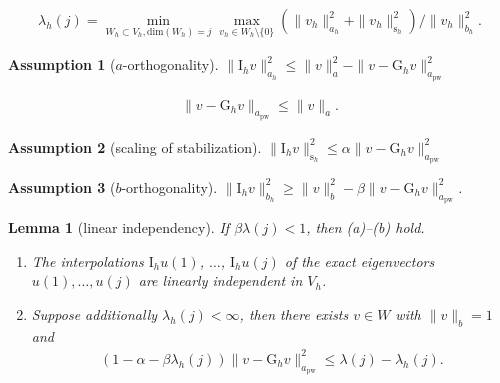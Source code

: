\documentclass[10pt,a4paper]{amsart}
\newtheorem{assumption}{Assumption}
\newtheorem{lemma}{Lemma}
\newcommand{\I}{\mathrm{I}}
\newcommand{\pw}{\mathrm{pw}}
\newcommand{\s}{\mathrm{s}}
\begin{document}
\begin{align}\label{eq:min-max-principle-discrete}
	\lambda_h(j) = \min_{W_h \subset V_h, \mathrm{dim}(W_h) = j} \max_{v_h \in W_h \setminus\{0\}} (\|v_h\|_{a_h}^2 + \|v_h\|_{\s_h}^2)/\|v_h\|_{b_h}^2.
\end{align}

\begin{assumption}[$a$-orthogonality]\label{A}
	$\|\I_h v\|_{a_h}^2 \leq \|v\|^2_a - \|v - \mathrm{G}_h v\|_{a_\pw}^2$
\end{assumption}

\begin{align}\label{ineq:v-Gv<=v}
	\|v - \mathrm{G}_h v\|_{a_\pw} \leq \|v\|_a.
\end{align}

\begin{assumption}[scaling of stabilization]\label{B}
	$\|\I_h v\|_{\s_h}^2 \leq \alpha \|v - \mathrm{G}_h v\|_{a_\pw}^2$
\end{assumption}

\begin{assumption}[$b$-orthogonality]\label{C}
	$\|\I_h v\|_{b_h}^2 \geq \|v\|_b^2 - \beta \|v - \mathrm{G}_h v\|_{a_\pw}^2$.
\end{assumption}

\begin{lemma}[linear independency]\label{lem:linear-independency}
	If $\beta \lambda(j) < 1$, then (a)--(b) hold.
	\begin{enumerate}[wide]
		\item[(a)] The interpolations $\I_h u(1)$, $\dots$, $\I_h u(j)$ of the exact eigenvectors $u(1), \dots, u(j)$ are linearly independent in $V_h$.
		\item[(b)] Suppose additionally $\lambda_h(j) < \infty$, then there exists $v \in W$ with $\|v\|_b = 1$ and
		\begin{align*}
			(1 - \alpha - \beta \lambda_h(j))\|v - \mathrm{G}_h v\|_{a_\pw}^2 \leq \lambda(j) - \lambda_h(j).
		\end{align*}
	\end{enumerate}
\end{lemma}
\end{document}
